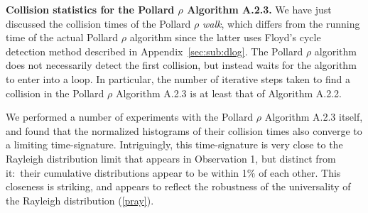 \documentclass{llncs}
\newcommand{\secref}[1]{Section~\ref{#1}}
\numberwithin{equation}{section}
\renewcommand\({\left(}
\renewcommand\){\right)}
\begin{document}
%
%
%
%
%
%



\noindent
{\bf Collision statistics for the   Pollard $\rho$ Algorithm A.2.3.}   We have just discussed the collision times of the Pollard $\rho$ {\it walk}, which differs from the running time of the actual Pollard $\rho$ algorithm since the latter uses Floyd's cycle detection method described in Appendix~\ref{sec:sub:dlog}.  The Pollard $\rho$ algorithm does not necessarily detect the first collision, but instead waits for the algorithm to enter into a loop.  In particular,
 the number of iterative steps taken to find a collision in the Pollard $\rho$ Algorithm A.2.3 is at least that of Algorithm A.2.2.

 We performed a number of experiments with the Pollard $\rho$ Algorithm A.2.3 itself, and found that the  normalized histograms of their collision times also converge to a limiting time-signature.  Intriguingly, this time-signature is
   very close to the Rayleigh distribution limit that appears in Observation 1, but distinct from it:~their cumulative  distributions  appear  to be within 1\% of each other.
    This closeness is striking, and appears to reflect the robustness of the universality of the Rayleigh distribution (\ref{pray}).
\end{document}
